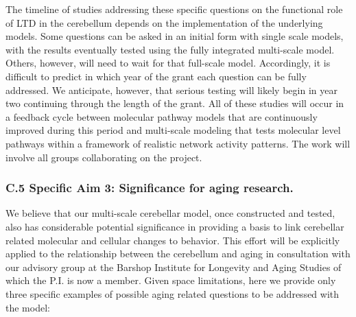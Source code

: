 \documentclass[12pt]{article}
\begin{document}
{The timeline of studies addressing these specific questions on the functional role of LTD in the cerebellum depends on the implementation of the underlying models. Some questions can be asked in an initial form with single scale models, with the results eventually tested using the fully integrated multi-scale model. Others, however, will need to wait for that full-scale model. Accordingly, it is difficult to predict in which year of the grant each question can be fully addressed. We anticipate, however, that serious testing will likely begin in year two continuing through the length of the grant. All of these studies will occur in a feedback cycle between molecular pathway models that are continuously improved during this period and multi-scale modeling that tests molecular level pathways within a framework of realistic network activity patterns. The work will involve all groups collaborating on the project.\\

\subsubsection*{C.5 Specific Aim 3: Significance for aging research.}

\noindent We believe that our multi-scale cerebellar model, once constructed and tested, also has considerable potential significance in providing a basis to link cerebellar related molecular and cellular changes to behavior. This effort will be explicitly applied to the relationship between the cerebellum and aging in consultation with our advisory group at the Barshop Institute for Longevity and Aging Studies of which the P.I. is now a member. Given space limitations, here we provide only three specific examples of possible aging related questions to be addressed with the model:

}
\end{document}
